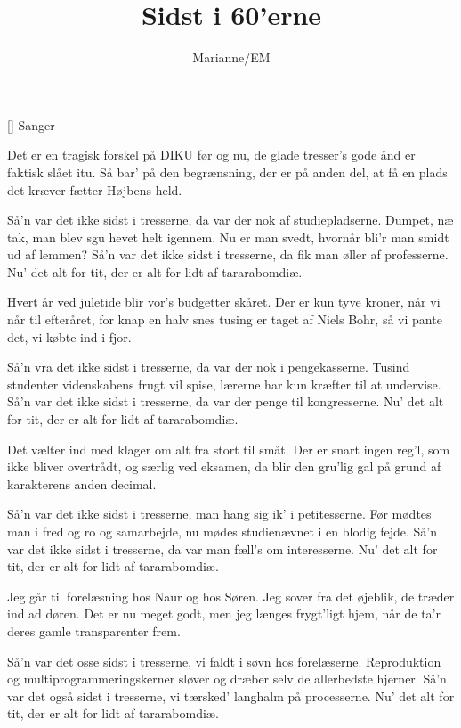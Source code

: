 \documentclass[a4paper,11pt]{article}
\title{Sidst i 60'erne}
\author{Marianne/EM}
\begin{document}
\maketitle

\begin{roles}
  [] Sanger
\end{roles}

\begin{song}
  Det er en tragisk forskel på DIKU før og nu,
  de glade tresser's gode ånd er faktisk slået itu.
  Så bar' på den begrænsning, der er på anden del,
  at få en plads det kræver fætter Højbens held.

  Så'n var det ikke sidst i tresserne,
  da var der nok af studiepladserne.
  Dumpet, næ tak,
  man blev sgu hevet helt igennem.
  Nu er man svedt,
  hvornår bli'r man smidt ud af lemmen?
  Så'n var det ikke sidst i tresserne,
  da fik man øller af professerne.
  Nu' det alt for tit,
  der er alt for lidt
  af tararabomdiæ.

  Hvert år ved juletide blir vor's budgetter skåret.
  Der er kun tyve kroner, når vi når til efteråret,
  for knap en halv snes tusing er taget af Niels Bohr,
  så vi pante det, vi købte ind i fjor.

  Så'n vra det ikke sidst i tresserne,
  da var der nok i pengekasserne.
  Tusind studenter videnskabens frugt vil spise,
  lærerne har kun kræfter til at undervise.
  Så'n var det ikke sidst i tresserne,
  da var der penge til kongresserne.
  Nu' det alt for tit,
  der er alt for lidt
  af tararabomdiæ.

  Det vælter ind med klager om alt fra stort til småt.
  Der er snart ingen reg'l, som ikke bliver overtrådt,
  og særlig ved eksamen, da blir den gru'lig gal
  på grund af karakterens anden decimal.

  Så'n var det ikke sidst i tresserne,
  man hang sig ik' i petitesserne.
  Før mødtes man i fred og ro og samarbejde,
  nu mødes studienævnet i en blodig fejde.
  Så'n var det ikke sidst i tresserne,
  da var man fæll's om interesserne.
  Nu' det alt for tit,
  der er alt for lidt
  af tararabomdiæ.

  Jeg går til forelæsning hos Naur og hos Søren.
  Jeg sover fra det øjeblik, de træder ind ad døren.
  Det er nu meget godt, men jeg længes frygt'ligt hjem,
  når de ta'r deres gamle transparenter frem.

  Så'n var det osse sidst i tresserne,
  vi faldt i søvn hos forelæserne.
  Reproduktion og multiprogrammeringskerner
  sløver og dræber selv de allerbedste hjerner.
  Så'n var det også sidst i tresserne,
  vi tærsked' langhalm på processerne.
  Nu' det alt for tit,
  der er alt for lidt
  af tararabomdiæ.


\end{song}
\end{document}
